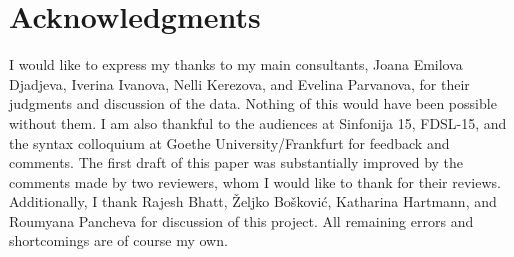 \documentclass[output=paper,colorlinks,citecolor=brown]{langscibook}
\begin{document}
\section*{Acknowledgments}
I would like to express my thanks to my main consultants, Joana Emilova Djadjeva, Iverina Ivanova, Nelli Kerezova, and Evelina Parvanova, for their judgments and discussion of the data. Nothing of this would have been possible without them. I am also thankful to the audiences at Sinfonija 15, FDSL-15, and the syntax colloquium at Goethe University/Frankfurt for feedback and comments. The first draft of this paper was substantially improved by the comments made by two reviewers, whom I would like to thank for their reviews. Additionally, I thank Rajesh Bhatt, \v{Z}eljko Bo\v{s}kovi\'{c}, Katharina Hartmann, and Roumyana Pancheva for discussion of this project. All remaining errors and shortcomings are of course my own. 

\printbibliography[heading=subbibliography,notkeyword=this]
\end{document}
